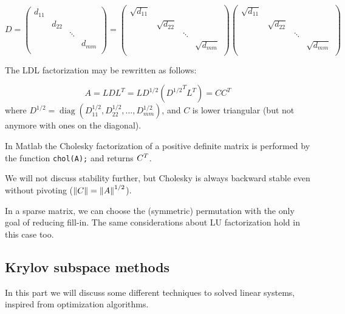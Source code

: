 \documentclass[ComputationalMathematics.tex]{subfiles}
\begin{document}
$D = \begin{pmatrix}
  d_{11}&&\\
  &d_{22} &\\
  && \ddots\\
  &&& d_{mm}\\
\end{pmatrix} = \begin{pmatrix}
  \sqrt{d_{11}}&&\\
  &\sqrt{d_{22}} &\\
  && \ddots\\
  &&& \sqrt{d_{mm}}\\
\end{pmatrix}
\begin{pmatrix}
  \sqrt{d_{11}}&&\\
  &\sqrt{d_{22}} &\\
  && \ddots\\
  &&& \sqrt{d_{mm}}\\
\end{pmatrix}
$

The LDL factorization may be rewritten as follows:

\[
A = LDL^T = LD^{1/2} ({D^{1/2}}^T L^T) = C C^T
\]
where $D^{1/2} = \operatorname{diag}(D_{11}^{1/2}, D_{22}^{1/2},\dots,D_{mm}^{1/2})$, and $C$ is lower triangular (but not anymore with ones on the diagonal).

In Matlab the Cholesky factorization of a positive definite matrix is performed by the function \texttt{chol(A);} and returns ${C}^{T}$.

\begin{obs}
We will not discuss stability further, but Cholesky is always backward stable even without pivoting ($\left\lVert C\right\rVert=\left\lVert A\right\rVert^{1/2}$).
\end{obs}


\begin{obs}
In a sparse matrix, we can choose the (symmetric) permutation with the only goal of reducing fill-in. The same considerations about LU factorization hold in this case too.
\end{obs}

\subsection{Krylov subspace methods}

In this part we will discuss some different techniques to solved linear systems, inspired from optimization algorithms.
\end{document}
